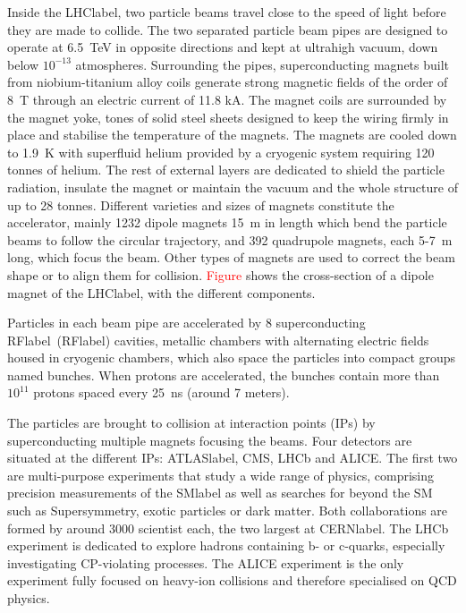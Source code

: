 Inside the \acrshort{LHClabel}, two particle beams travel close to the speed of light before they are made to collide. The two separated particle beam pipes are designed to operate at 6.5~TeV in opposite directions and kept at ultrahigh vacuum, down below $10^{-13}$ atmospheres. Surrounding the pipes, superconducting magnets built from niobium-titanium alloy coils generate strong magnetic fields of the order of 8~T through an electric current of 11.8 kA. The magnet coils are surrounded by the magnet yoke, tones of solid steel sheets designed to keep the wiring firmly in place and stabilise the temperature of the magnets. The magnets are cooled down to 1.9~K with superfluid helium provided by a cryogenic system requiring 120 tonnes of helium. The rest of external layers are dedicated to shield the particle radiation, insulate the magnet or maintain the vacuum and the whole structure of up to 28 tonnes. Different varieties and sizes of magnets constitute the accelerator, mainly 1232 dipole magnets 15~m in length which bend the particle beams to follow the circular trajectory, and 392 quadrupole magnets, each 5-7~m long, which focus the beam. Other types of magnets are used to correct the beam shape or to align them for collision. \textcolor{red}{Figure} shows the cross-section of a dipole magnet of the \acrshort{LHClabel}, with the different components.

Particles in each beam pipe are accelerated by 8 superconducting \acrlong{RFlabel}~(\acrshort{RFlabel}) cavities, metallic chambers with alternating electric fields housed in cryogenic chambers, which also space the particles into compact groups named bunches. When protons are accelerated, the bunches contain more than $10^11$ protons spaced every 25~ns (around 7 meters).

The particles are brought to collision at interaction points (IPs) by superconducting multiple magnets focusing the beams. Four detectors are situated at the different IPs: \acrshort{ATLASlabel}, CMS, LHCb and ALICE. The first two are multi-purpose experiments that study a wide range of physics, comprising precision measurements of the \acrshort{SMlabel} as well as searches for beyond the SM such as Supersymmetry, exotic particles or dark matter. Both collaborations are formed by around 3000 scientist each, the two largest at \acrshort{CERNlabel}. The LHCb experiment is dedicated to explore hadrons containing b- or c-quarks, especially investigating CP-violating processes. The ALICE experiment is the only experiment fully focused on heavy-ion collisions and therefore specialised on QCD physics. 


